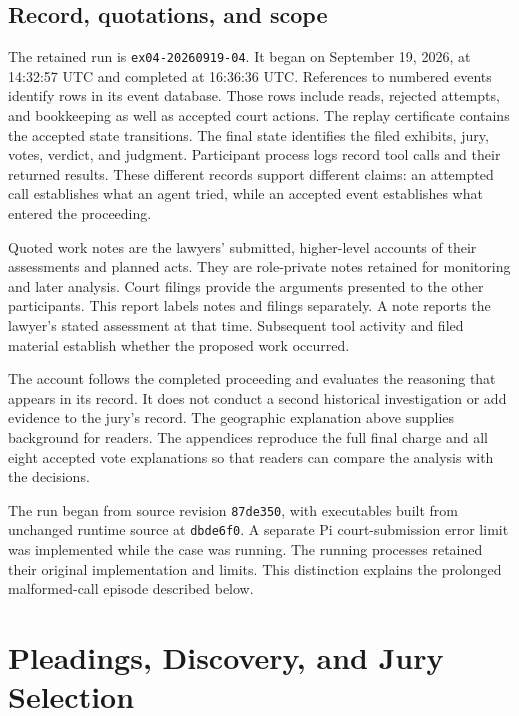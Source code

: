 \documentclass[11pt]{article}
\newcommand{\code}[1]{\texttt{#1}}
\begin{document}
\subsection{Record, quotations, and scope}

The retained run is \code{ex04-20260919-04}.  It began on September 19, 2026, at 14:32:57 UTC and completed at 16:36:36 UTC.  References to numbered events identify rows in its event database.  Those rows include reads, rejected attempts, and bookkeeping as well as accepted court actions.  The replay certificate contains the accepted state transitions.  The final state identifies the filed exhibits, jury, votes, verdict, and judgment.  Participant process logs record tool calls and their returned results.  These different records support different claims: an attempted call establishes what an agent tried, while an accepted event establishes what entered the proceeding.

Quoted work notes are the lawyers' submitted, higher-level accounts of their assessments and planned acts.  They are role-private notes retained for monitoring and later analysis.  Court filings provide the arguments presented to the other participants.  This report labels notes and filings separately.  A note reports the lawyer's stated assessment at that time.  Subsequent tool activity and filed material establish whether the proposed work occurred.

The account follows the completed proceeding and evaluates the reasoning that appears in its record.  It does not conduct a second historical investigation or add evidence to the jury's record.  The geographic explanation above supplies background for readers.  The appendices reproduce the full final charge and all eight accepted vote explanations so that readers can compare the analysis with the decisions.

The run began from source revision \code{87de350}, with executables built from unchanged runtime source at \code{dbde6f0}.  A separate Pi court-submission error limit was implemented while the case was running.  The running processes retained their original implementation and limits.  This distinction explains the prolonged malformed-call episode described below.

\section{Pleadings, Discovery, and Jury Selection}
\end{document}

